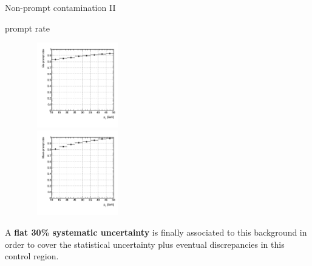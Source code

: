 \documentclass[8pt]{beamer}
\begin{document}
\begin{frame}{Non-prompt contamination II}
\vspace{-10pt}
\begin{block}{ prompt rate}\end{block} \vspace{-10pt}
\begin{figure}[htbp]
\begin{center}
\begin{minipage}[b]{.49\textwidth}
\begin{center}
\includegraphics[width=4.2cm, height=3.7cm]{figs/Ele_PR_pt_2016.png}
\end{center}
\end{minipage} \hfill
\begin{minipage}[b]{.49\textwidth}
\begin{center}
\includegraphics[width=4.2cm, height=3.7cm]{figs/Muon_PR_pt_2016.png}
\end{center}
\end{minipage} \hfill
\end{center}
\end{figure} \vfill

A \textbf{flat 30\% systematic uncertainty} is finally associated to this background in order to cover the statistical uncertainty plus eventual discrepancies in this control region. \vfill
\end{frame}
\end{document}
